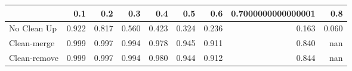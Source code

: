 \begin{tabular}{lrrrrrrrr}
\toprule
{} &   0.1 &   0.2 &   0.3 &   0.4 &   0.5 &   0.6 & 0.7000000000000001 &   0.8 \\
\midrule
No Clean Up  & 0.922 & 0.817 & 0.560 & 0.423 & 0.324 & 0.236 &              0.163 & 0.060 \\
Clean-merge  & 0.999 & 0.997 & 0.994 & 0.978 & 0.945 & 0.911 &              0.840 &   nan \\
Clean-remove & 0.999 & 0.997 & 0.994 & 0.980 & 0.944 & 0.912 &              0.844 &   nan \\
\bottomrule
\end{tabular}
